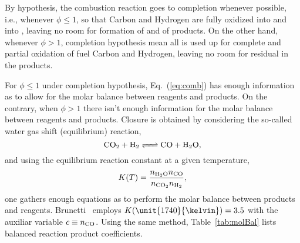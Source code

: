     By hypothesis, the combustion reaction goes to completion whenever possible, i.e., whenever $\phi \leqslant 1$, so that Carbon and Hydrogen  are  fully  oxidized  into    and  into
    , leaving no room for formation of  and of  products. On the other hand, whenever $\phi > 1$, completion hypothesis mean all   is  used  up  for  complete  and
    partial oxidation of fuel Carbon and Hydrogen, leaving no room for residual  in the products.

    For $\phi \leqslant 1$ under completion hypothesis, Eq.~(\ref{eq:comb}) has enough information as to allow for the molar balance between reagents and products. On the contrary, when  $\phi
    > 1$ there isn't enough information for the molar balance between reagents and products. Closure is obtained by considering the so-called water gas shift (equilibrium) reaction,%
    \begin{equation}
        \mbox{\ce{CO2 + H2 <=> CO + H2O}},
        \label{eq:wgsr}
    \end{equation}
    \noindent and using the equilibrium reaction constant at a given temperature,%
    \begin{equation}
        K(T) = \frac{\NHHO\NCO}{\NCOO\NHH},
        \label{eq:K}
    \end{equation}
    \noindent one gathers enough equations as to perform the molar balance between products and reagents. Brunetti~\cite{2012-BrunettiF-Blucher} employs $K(\unit{1740}{\kelvin})  =  3.5$  with
    the auxiliar variable $c\equiv\NCO$. Using the same method, Table~\ref{tab:molBal} lists balanced reaction product coefficients.

